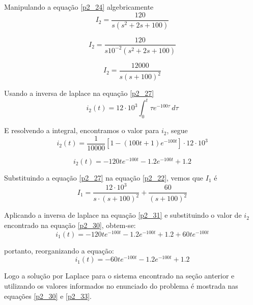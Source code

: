 \documentclass[12pt]{article}%
\begin{document}
    Manipulando a equação \ref{p2_24} algebricamente
    \begin{equation}
      I_2 = \frac{120}{s(s^2+2s+100)}
    \label{p2_25}
    \end{equation}
    
    \begin{equation}
        I_2 = \frac{120}{s10^{-2}(s^2+2s+100)}
    \label{p2_26}
    \end{equation}
    
    \begin{equation}
        I_2 = \frac{12000}{s(s+100)^2}
    \label{p2_27}
    \end{equation}
    
    Usando a inversa de laplace na equação \ref{p2_27}
    \begin{equation}
      i_2(t) = 12\cdot10^3 \int_{0}^{t} \tau e^{-100\tau}\,d\tau
    \label{p2_28}
    \end{equation}
    
    E resolvendo a integral, encontramos o valor para $i_2$, segue
    \begin{equation}
      i_2(t) = \frac{1}{10000}[1 - (100t+1)e^{-100t}]\cdot 12 \cdot 10^3
    \label{p2_29}
    \end{equation}
    
    \begin{equation}
      i_2(t) = -120te^{-100t}-1.2e^{-100t}+1.2
    \label{p2_30}
    \end{equation}
    
    Substituindo a equação \ref{p2_27} na equação \ref{p2_22}, vemos que $I_1$ é 
    \begin{equation}
      I_1 = \frac{12 \cdot 10^3}{s \cdot(s+100)^2} + \frac{60}{(s+100)^2}
    \label{p2_31}
    \end{equation}
    
    Aplicando a inversa de laplace na equação \ref{p2_31} e substituindo o valor de $i_2$ encontrado na equação \ref{p2_30}, obtem-se:
    \begin{equation}
      i_1(t) = -120te^{-100t} - 1.2e^{-100t} + 1.2 + 60te^{-100t}
    \label{p2_32}
    \end{equation}
    
    portanto, reorganizando a equação:
    \begin{equation}
      i_1(t) = -60te^{-100t}-1.2e^{-100t} + 1.2
    \label{p2_33}
    \end{equation}
    
    Logo a solução por Laplace para o sistema encontrado na seção anterior e utilizando os valores informados no enunciado do problema é mostrada nas equações \ref{p2_30} e \ref{p2_33}.
    
\end{document}
